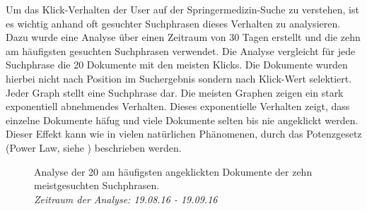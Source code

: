 
Um das Klick-Verhalten der User auf der Springermedizin-Suche zu verstehen, ist es wichtig anhand oft gesuchter Suchphrasen dieses Verhalten zu analysieren. Dazu wurde eine Analyse über einen Zeitraum von 30 Tagen erstellt und die zehn am häufigsten gesuchten Suchphrasen verwendet. Die Analyse vergleicht für jede Suchphrase die 20 Dokumente mit den meisten Klicks. Die Dokumente wurden hierbei nicht nach Position im Suchergebnis sondern nach Klick-Wert selektiert. Jeder Graph stellt eine Suchphrase dar. Die meisten Graphen zeigen ein stark exponentiell abnehmendes Verhalten. Dieses exponentielle Verhalten zeigt, dass einzelne Dokumente häfug und viele Dokumente selten bis nie angeklickt werden. Dieser Effekt kann wie in vielen natürlichen Phänomenen, durch das Potenzgesetz (Power Law, siehe \cite{PowerLaw}) beschrieben werden. 

\begin{figure}[H]
\centering 
 
\topSearchphrases
  


\caption[Analyse der 20 am häufigsten angeklickten Dokumente  der zehn meistgesuchten Suchphrasen. \textit{Zeitraum der Analyse: 19.08.16 - 19.09.16}]{Analyse der 20 am häufigsten angeklickten Dokumente  der zehn meistgesuchten Suchphrasen. \\ \textit{Zeitraum der Analyse: 19.08.16 - 19.09.16}}
\label{fig:Grundlagen:AnalyseKlicksTop10Suchergebnisse}
\end{figure}

